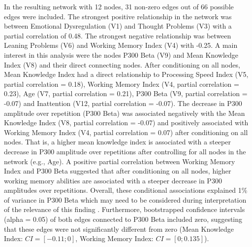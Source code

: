 In the resulting network with 12 nodes, 31 non-zero edges out of 66 possible edges were included. The strongest positive relationship in the network was between Emotional Dysregulation (V1) and Thought Problems (V3) with a partial correlation of 0.48. The strongest negative relationship was between Leaning Problems (V6) and Working Memory Index (V4) with -0.25. A main interest in this analysis were the nodes P300 Beta (V9) and Mean Knowledge Index (V8) and their direct connecting nodes. After conditioning on all nodes, Mean Knowledge Index had a direct relationship to Processing Speed Index (V5, partial correlation = 0.18), Working Memory Index (V4, partial correlation = 0.23), Age (V7, partial correlation = 0.21), P300 Beta (V9, partial correlation = -0.07) and Inattention (V12, partial correlation =  -0.07). The decrease in P300 amplitude over repetition (P300 Beta) was associated negatively with the Mean Knowledge Index (V8, partial correlation = -0.07) and positively associated with Working Memory Index (V4, partial correlation = 0.07) after conditioning on all nodes. That is, a higher mean knowledge index is associated with a steeper decrease in P300 amplitude over repetitions after controlling for all nodes in the network (e.g., Age). A positive partial correlation between Working Memory Index and P300 Beta suggested that after conditioning on all nodes, higher working memory abilities are associated with a steeper decrease in P300 amplitudes over repetitions. Overall, these conditional associations explained 1\% of variance in P300 Beta which may need to be considered during interpretation of the relevance of this finding \parencite{haslbeckHowWellNetwork2018}.  Furthermore, bootstrapped confidence intervals (alpha = 0.05) of both edges connected to P300 Beta included zero, suggesting that these edges were not significantly different from zero (Mean Knowledge Index: $CI = [-0.11; 0]$, Working Memory Index: $CI = [0; 0.135]$). 

